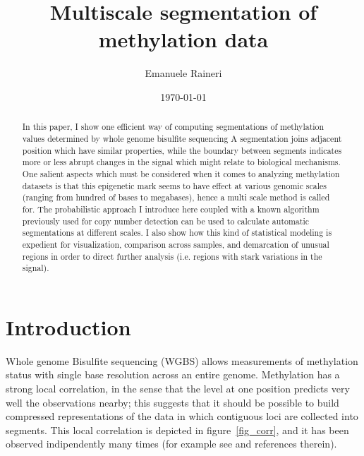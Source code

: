 \documentclass[12pt]{amsart}
\begin{document}
\title{Multiscale segmentation of methylation data}
\author{Emanuele Raineri}
\date{\today}
\maketitle

\begin{abstract}
In this paper, I show one efficient way of computing 
segmentations of methylation values determined by 
whole genome bisulfite sequencing
A segmentation joins adjacent position
which have similar properties, while the boundary between segments 
indicates more or less abrupt changes
in the signal which might relate to biological mechanisms. 
One salient aspects which must be considered when it comes to 
analyzing methylation datasets is that this epigenetic mark seems 
to have effect at various genomic scales 
(ranging from hundred of bases to megabases), hence a multi scale method 
is called for. 
The probabilistic approach I introduce here 
coupled with a known algorithm previously
used for copy number detection
can be used to calculate automatic segmentations at different scales.
I also show how this 
kind of statistical modeling is expedient for 
visualization, comparison across samples,
and demarcation of unusual regions in 
order to direct further analysis (i.e. regions with stark variations in the signal).
\end{abstract}

\section{Introduction}

Whole genome Bisulfite sequencing (WGBS) allows measurements of methylation 
status with single base resolution across an entire genome. 
Methylation has a strong local correlation,
in the sense that the level at one position predicts 
very well the observations nearby; this suggests that it should be possible
to build compressed representations of the data in which contiguous loci 
are collected into segments.
This local correlation is depicted in figure~\ref{fig_corr},
and it has been observed indipendently many times (for example
see \cite{bsmooth} and references therein).
\end{document}
